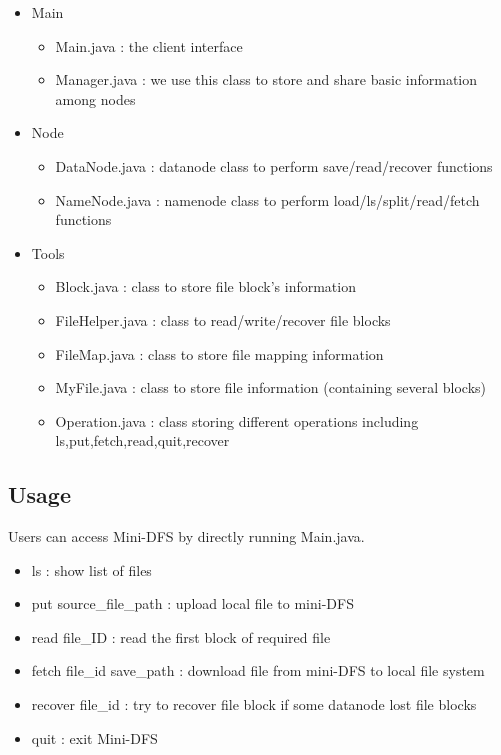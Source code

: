 \documentclass[10pt]{article}
\begin{document}
\begin{itemize}
  \item Main
  \begin{itemize}
    \item Main.java : the client interface
    \item Manager.java : we use this class to store and share basic information among nodes
  \end{itemize}
  \item Node
  \begin{itemize}
    \item DataNode.java : datanode class to perform save/read/recover functions
    \item NameNode.java : namenode class to perform load/ls/split/read/fetch functions
  \end{itemize}
  \item Tools
  \begin{itemize}
    \item Block.java : class to store file block's information
    \item FileHelper.java : class to read/write/recover file blocks
    \item FileMap.java : class to store file mapping information
    \item MyFile.java : class to store file information (containing several blocks)
    \item Operation.java : class storing different operations including ls,put,fetch,read,quit,recover
  \end{itemize}
\end{itemize}

\subsection{Usage}

Users can access Mini-DFS by directly running Main.java.

\begin{itemize}
  \item ls : show list of files
  \item put source\_file\_path : upload local file to mini-DFS
  \item read file\_ID : read the first block of required file
  \item fetch file\_id save\_path : download file from mini-DFS to local file system
  \item recover file\_id : try to recover file block if some datanode lost file blocks
  \item quit : exit Mini-DFS
\end{itemize}
\end{document}
